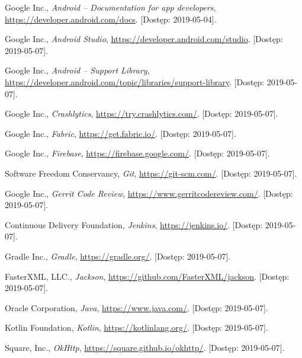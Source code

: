 \documentclass{pracamgr}
\begin{document}
\begin{thebibliography}{99}


 Google Inc., \textit{Android -- Documentation for app developers},
	 \url{https://developer.android.com/docs}. [Dostęp: 2019-05-04].

 Google Inc., \textit{Android Studio},
	\url{https://developer.android.com/studio}. [Dostęp: 2019-05-07].

 Google Inc., \textit{Android -- Support Library},
	\url{https://developer.android.com/topic/libraries/support-library}. [Dostęp: 2019-05-07].

 Google Inc., \textit{Crashlytics}, \url{https://try.crashlytics.com/}. [Dostęp: 2019-05-07].

 Google Inc., \textit{Fabric}, \url{https://get.fabric.io/}. [Dostęp: 2019-05-07].

 Google Inc., \textit{Firebase}, \url{https://firebase.google.com/}. [Dostęp: 2019-05-07].

 Software Freedom Conservancy, \textit{Git},
	\url{https://git-scm.com/}. [Dostęp: 2019-05-07].

 Google Inc., \textit{Gerrit Code Review},
	\url{https://www.gerritcodereview.com/}. [Dostęp: 2019-05-07].

 Continuous Delivery Foundation, \textit{Jenkins},
	\url{https://jenkins.io/}. [Dostęp: 2019-05-07].

  Gradle Inc., \textit{Gradle},	\url{https://gradle.org/}. [Dostęp: 2019-05-07].

  FasterXML, LLC., \textit{Jackson},
	\url{https://github.com/FasterXML/jackson}. [Dostęp: 2019-05-07].

 Oracle Corporation, \textit{Java}, \url{https://www.java.com/}. [Dostęp: 2019-05-07].

 Kotlin Foundation, \textit{Kotlin}, \url{https://kotlinlang.org/}. [Dostęp: 2019-05-07].

 Square, Inc., \textit{OkHttp},	\url{https://square.github.io/okhttp/}. [Dostęp: 2019-05-07].


\end{thebibliography}
\end{document}

